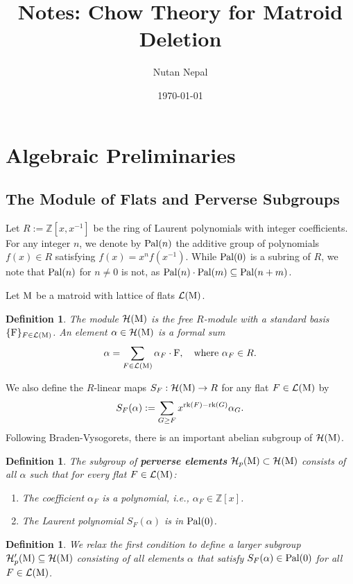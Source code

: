 \documentclass[11pt]{article}
\title{Notes: Chow Theory for Matroid Deletion}
\author{Nutan Nepal}
\date{\today}
\newcommand{\calH}{\mathcal{H}}
\newcommand{\rank}{\normalfont\text{rk}}
\newcommand{\M}{\normalfont\text{M}}
\newcommand{\ZZ}{\mathbb{Z}}
\newcommand{\Ebasis}[1]{\mathrm{#1}}
\newcommand{\pal}{\normalfont\text{Pal}}
\newtheorem{definition}[theorem]{Definition}
\theoremstyle{remark}
\begin{document}
\maketitle

\section{Algebraic Preliminaries}

\subsection{The Module of Flats and Perverse Subgroups}
Let \(R := \ZZ[x, x^{-1}]\) be the ring of Laurent polynomials with integer coefficients.
For any integer \(n\), we denote by \(\pal(n)\) the additive group of polynomials \(f(x) \in R\)
satisfying \(f(x) = x^n f(x^{-1})\). While \(\pal(0)\) is a subring of \(R\), we note that
\(\pal(n)\) for \(n \neq 0\) is not, as \(\pal(n) \cdot \pal(m) \subseteq \pal(n+m)\).

Let \(\M\) be a matroid with lattice of flats \(\mathcal{L}(\M)\).
\begin{definition}
    The module \(\calH(\M)\) is the free \(R\)-module with a standard basis \(\{\Ebasis{F}\}_{F \in \mathcal{L}(\M)}\). An element \(\alpha \in \calH(\M)\) is a formal sum
    \[ \alpha = \sum_{F \in \mathcal{L}(\M)} \alpha_F \cdot\Ebasis{F}, \quad \text{where } \alpha_F \in R. \]
\end{definition}

We also define the \(R\)-linear maps \(S_F: \calH(\M) \to R\) for any flat \(F \in \mathcal{L}(\M)\) by
\[ S_F(\alpha) := \sum_{G \ge F} x^{\rank(F)-\rank(G)} \alpha_G. \]
Following Braden-Vysogorets, there is an important abelian subgroup of \(\calH(\M)\).
\begin{definition}
    The subgroup of \textbf{perverse elements} \(\calH_p(\M) \subset \calH(\M)\) consists of all \(\alpha\) such that for every flat \(F \in \mathcal{L}(\M)\):
    \begin{enumerate}
        \item The coefficient \(\alpha_F\) is a polynomial, i.e., \(\alpha_F \in \ZZ[x]\).
        \item The Laurent polynomial \(S_F(\alpha)\) is in \(\pal(0)\).
    \end{enumerate}
\end{definition}
\begin{definition}
    We relax the first condition to define a larger subgroup \(\calH'_p(\M) \subseteq \calH(\M)\)
    consisting of all elements \(\alpha\) that satisfy \(S_F(\alpha) \in \pal(0)\)
    for all \(F \in \mathcal{L}(\M)\).
\end{definition}
\end{document}
